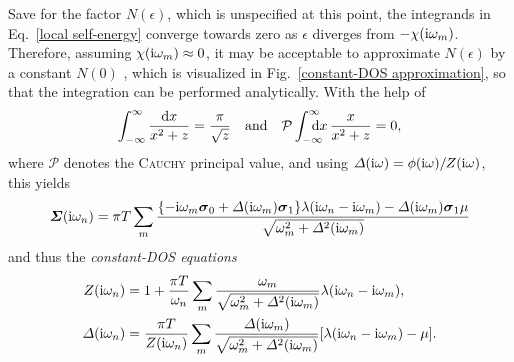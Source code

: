 Save for the factor $N(\epsilon)$, which is unspecified at this point, the
integrands in Eq.~\ref{local self-energy} converge towards zero as $\epsilon$
diverges from $-\chi(\mathrm i \omega_m)$. Therefore, assuming $\chi(\mathrm i \omega_m)
\approx 0$, it may be acceptable to approximate $N(\epsilon)$ by a constant
$N(0)$ \cites [below Eq.~26]{Allen76} [17]{AllenMitrovic82}
[Sec.~B]{MargineGiustino13}, which is visualized in Fig.~\ref{constant-DOS
approximation}, so that the integration can be performed analytically. With the
help of
%
\begin{equation} \label{integrals}
    \int_{-\infty}^\infty \frac{\D x}{x^2 + z} = \frac \pi {\sqrt z}
    \quad \text{and} \quad
    \mathcal P \int \from{-\infty} \till \infty \D x \, \frac x {x^2 + z} = 0,
\end{equation}
%
where $\mathcal P$ denotes the \textsc{Cauchy} principal value, and using
$\varDelta(\mathrm i \omega) = \phi(\mathrm i \omega) / Z(\mathrm i \omega)$, this yields
%
\begin{equation*}
    \boldsymbol {\varSigma}(\mathrm i \omega_n)
    = \pi T \sum_m \frac{ \{
        - \mathrm i \omega_m \boldsymbol \sigma_0
        + \varDelta(\mathrm i \omega_m) \boldsymbol \sigma_1 \}
        \lambda(\mathrm i \omega_n - \mathrm i \omega_m)
        - \varDelta(\mathrm i \omega_m) \boldsymbol \sigma_1 \mu }
        { \sqrt{\omega_m^2 + \varDelta^2(\mathrm i \omega_m)} }
\end{equation*}
%
and thus the \emph{constant-DOS  equations}
%
\begin{subequations}
    \begin{align}
        Z(\mathrm i \omega_n) &= 1 + \frac{\pi T}{\omega_n} \sum_m
        \frac{\omega_m}{\sqrt{\omega_m^2 + \varDelta^2(\mathrm i \omega_m)}}
        \lambda(\mathrm i \omega_n - \mathrm i \omega_m),
        \\
        \varDelta(\mathrm i \omega_n) &= \frac{\pi T}{Z(\mathrm i \omega_n)} \sum_m
        \frac{\varDelta(\mathrm i \omega_m)}{\sqrt{\omega_m^2 + \varDelta^2(\mathrm i \omega_m)}}
        [\lambda(\mathrm i \omega_n - \mathrm i \omega_m) - \mu].
    \end{align}
\end{subequations}

